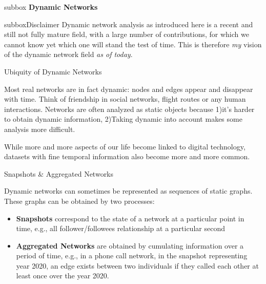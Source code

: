 \documentclass[a4paper,11pt]{book}
\begin{document}

\newpage



\begin{subbox}{subbox}{}
\centering
\Large{\textbf{Dynamic Networks}}
\end{subbox}


\begin{subbox}{subbox}{Disclaimer}
Dynamic network analysis as introduced here is a recent and still not fully mature field, with a large number of contributions, for which we cannot know yet which one will stand the test of time. This is therefore \textit{my} vision of the dynamic network field  \textit{as of today}.
\end{subbox}



\begin{textbox}{Ubiquity of Dynamic Networks}

Most real networks are in fact dynamic: nodes and edges appear and disappear with time. Think of friendship in social networks, flight routes or any human interactions. Networks are often analyzed as static objects because 1)it's harder to obtain dynamic information, 2)Taking dynamic into account makes some analysis more difficult. 

While more and more aspects of our life become linked to digital technology, datasets with fine temporal information also become more and more common.
\end{textbox}




\begin{textbox}{Snapshots \& Aggregated Networks}

Dynamic networks can sometimes be represented as sequences of static graphs.
These graphs can be obtained by two processes:
\begin{itemize}
    \item \textbf{Snapshots} correspond to the state of a network at a particular point in time, e.g., all follower/followees relationship at a particular second
    \item \textbf{Aggregated Networks} are obtained by cumulating information over a period of time, e.g., in a phone call network, in the snapshot representing year 2020, an edge exists between two individuals if they called each other at least once over the year 2020.
\end{itemize}
\end{textbox}
\end{document}
